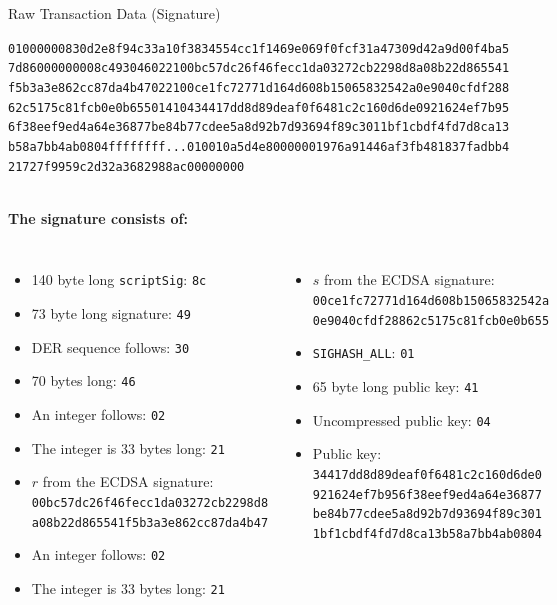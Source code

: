 \documentclass[]{beamer}
\begin{document}
\begin{frame}{Raw Transaction Data (Signature)}
\begin{scriptsize}
\texttt{\textcolor{black!30}{01000000830d2e8f94c33a10f3834554cc1f1469e069f0fcf31a47309d42a9d00f4ba5
7d8600000000}{\alert<2>{8c}\alert<3>{49}\alert<4>{30}\alert<5>{46}\alert<6>{02}\alert<7>{21}\alert<8>{00bc57dc26f46fecc1da03272cb2298d8a08b22d865541
f5b3a3e862cc87da4b47}\alert<9>{02}\alert<10>{21}\alert<11>{00ce1fc72771d164d608b15065832542a0e9040cfdf288
62c5175c81fcb0e0b655}\alert<12>{01}\alert<13>{41}\alert<14>{04}\alert<15>{34417dd8d89deaf0f6481c2c160d6de0921624ef7b95
6f38eef9ed4a64e36877be84b77cdee5a8d92b7d93694f89c3011bf1cbdf4fd7d8ca13
b58a7bb4ab0804}}\textcolor{black!30}{ffffffff...010010a5d4e80000001976a91446af3fb481837fadbb4
21727f9959c2d32a3682988ac00000000}}
\end{scriptsize}
\vspace{1em}
\scriptsize \\
\textbf{The signature consists of:}\\
\begin{columns}[T]
\begin{itemize}
	\item \alert<2>{140 byte long \texttt{scriptSig}: \texttt{8c}}
	\item \alert<3>{73 byte long signature: \texttt{49}}
	\item \alert<4>{DER sequence follows: \texttt{30}}
	\item \alert<5>{70 bytes long: \texttt{46}}
	\item \alert<6>{An integer follows: \texttt{02}}
	\item \alert<7>{The integer is 33 bytes long: \texttt{21}}
	\item \alert<8>{$r$ from the ECDSA signature: 	\texttt{00bc57dc26f46fecc1da03272cb2298d8\\
	a08b22d865541f5b3a3e862cc87da4b47}}
	\item \alert<9>{An integer follows: \texttt{02}}
	\item \alert<10>{The integer is 33 bytes long: \texttt{21}}
\end{itemize}
\begin{itemize}
	\item \alert<11>{$s$ from the ECDSA signature: \texttt{00ce1fc72771d164d608b15065832542a\\
	0e9040cfdf28862c5175c81fcb0e0b655}}
	\item \alert<12>{\texttt{SIGHASH\_ALL}: \texttt{01}}
	\item \alert<13>{65 byte long public key: \texttt{41}}
	\item \alert<14>{Uncompressed public key: \texttt{04}}
	\item \alert<15>{Public key: \texttt{34417dd8d89deaf0f6481c2c160d6de0\\
	921624ef7b956f38eef9ed4a64e36877\\
	be84b77cdee5a8d92b7d93694f89c301\\
	1bf1cbdf4fd7d8ca13b58a7bb4ab0804}}
\end{itemize}
\end{columns}
\end{frame}
\end{document}
